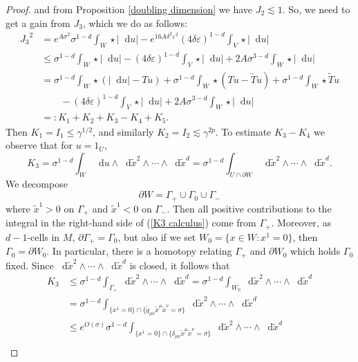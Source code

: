 \documentclass[reqno,12pt,letterpaper]{amsart}
\newcommand*\dif{\mathop{}\!\mathrm{d}}
\theoremstyle{definition}
\numberwithin{equation}{section}
\begin{document}
\begin{proof}
and from Proposition \ref{doubling dimension} we have $J_2 \lesssim 1$.
So, we need to get a gain from $J_3$, which we do as follows:
\begin{align*}
{J_3}^2 &= e^{A\sigma^2} \sigma^{1 - d} \int_W \star |\dif u| - e^{16A\delta^2 \varepsilon^2} (4\delta\varepsilon)^{1 - d} \int_V \star |\dif u| \\
&\leq \sigma^{1 - d} \int_W \star |\dif u| - (4 \delta \varepsilon)^{1 - d} \int_V \star |\dif u| + 2A\sigma^{3 - d} \int_W \star |\dif u| \\
&= \sigma^{1 - d} \int_W \star (|\dif u| - Tu) + \sigma^{1 - d} \int_W \star (Tu - \tilde Tu) + \sigma^{1 - d} \int_W \star \tilde Tu \\
&\qquad - (4 \delta\varepsilon)^{1 - d} \int_V \star |\dif u| + 2A \sigma^{3 - d} \int_W \star |\dif u| \\
&=: K_1 + K_2 + K_3 - K_4 + K_5.
\end{align*}
Then $K_1 = I_1 \leq \gamma^{1/2}$, and similarly $K_2 = I_2 \lesssim \gamma^{2p}$.
To estimate $K_3 - K_4$ we observe that for $u = 1_U$,
\begin{equation}\label{K3 calculus}
K_3 = \sigma^{1 - d} \int_W \dif u \wedge \dif \tilde x^2 \wedge \cdots \wedge \dif \tilde x^d = \sigma^{1 - d} \int_{U \cap \partial W} \dif \tilde x^2 \wedge \cdots \wedge \dif \tilde x^d.
\end{equation}
We decompose
$$\partial W = \Gamma_+ \cup \Gamma_0 \cup \Gamma_-$$
where $\tilde x^1 > 0$ on $\Gamma_+$ and $\tilde x^1 < 0$ on $\Gamma_-$. Then all positive contributions to the integral in the right-hand side of (\ref{K3 calculus}) come from $\Gamma_+$.
Moreover, as $d-1$-cells in $M$, $\partial \Gamma_+ = \Gamma_0$, but also if we set $W_0 = \{x \in W: x^1 = 0\}$, then $\Gamma_0 = \partial W_0$.
In particular, there is a homotopy relating $\Gamma_+$ and $\partial W_0$ which holds $\Gamma_0$ fixed.
Since $\dif \tilde x^2 \wedge \cdots \wedge \dif \tilde x^d$ is closed, it follows that 
\begin{align*}
K_3 &\leq \sigma^{1 - d} \int_{\Gamma_+} \dif \tilde x^2 \wedge \cdots \wedge \dif \tilde x^d = \sigma^{1 - d} \int_{W_0} \dif \tilde x^2 \wedge \cdots \wedge \dif \tilde x^d\\
& = \sigma^{1 - d} \int_{\{x^1 = 0\} \cap \{\tilde g_{\mu\nu} \tilde x^\mu \tilde x^\nu = \sigma\}} \dif \tilde x^2 \wedge \cdots \wedge \dif \tilde x^d\\
&\leq e^{O(\sigma)} \sigma^{1 - d} \int_{\{x^1 = 0\} \cap \{\delta_{\mu\nu} \tilde x^\mu \tilde x^\nu = \sigma\}} \dif \tilde x^2 \wedge \cdots \wedge \dif \tilde x^d\\

\end{align*}
\end{proof}
\end{document}
